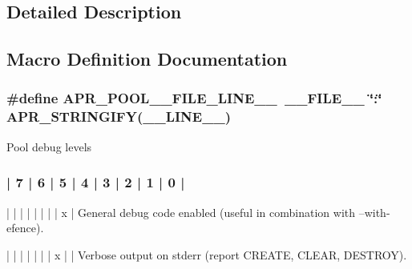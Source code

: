 \subsection{Detailed Description}


\subsection{Macro Definition Documentation}
\hypertarget{group__apr__pools_gac81cff34d0ff4be52fa924663478eade}{
\subsubsection[{A\-P\-R\-\_\-\-P\-O\-O\-L\-\_\-\-\_\-\-F\-I\-L\-E\-\_\-\-L\-I\-N\-E\-\_\-\-\_\-}]{\setlength{\rightskip}{0pt plus 5cm}\#define A\-P\-R\-\_\-\-P\-O\-O\-L\-\_\-\-\_\-\-F\-I\-L\-E\-\_\-\-L\-I\-N\-E\-\_\-\-\_\-~\-\_\-\-\_\-\-F\-I\-L\-E\-\_\-\-\_\- \char`\"{}\-:\char`\"{} {\bf A\-P\-R\-\_\-\-S\-T\-R\-I\-N\-G\-I\-F\-Y}(\-\_\-\-\_\-\-L\-I\-N\-E\-\_\-\-\_\-)}}\label{group__apr__pools_gac81cff34d0ff4be52fa924663478eade}
Pool debug levels


\begin{DoxyPre}
\subsubsection*{| 7 | 6 | 5 | 4 | 3 | 2 | 1 | 0 |
}\end{DoxyPre}



\begin{DoxyPre}
|   |   |   |   |   |   |   | x |  General debug code enabled (useful in
                                   combination with --with-efence).\end{DoxyPre}



\begin{DoxyPre}|   |   |   |   |   |   | x |   |  Verbose output on stderr (report
                                   CREATE, CLEAR, DESTROY).\end{DoxyPre}



